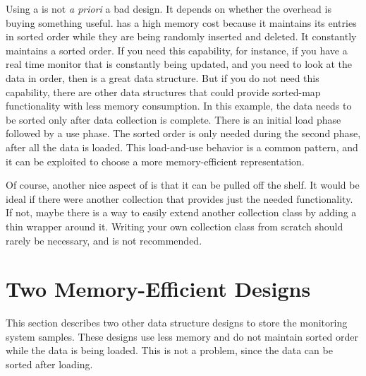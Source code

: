 

Using a  is not \textit{a priori} a bad design. It depends on
whether the overhead is buying something useful.  has a high
memory cost because it maintains its entries in sorted order while they are
being randomly inserted and deleted. It constantly maintains a sorted order. If
you need this capability, for instance, if you have a real time monitor that is
constantly being updated, and you need to look at the data in order, then
 is a great data structure.  But if you do not need
this capability, there are other data structures that could provide sorted-map
functionality with less memory consumption. In this example, the data needs to
be sorted only after data collection is complete. There is an initial load phase
followed by a use phase. The sorted order is only needed during the second
phase, after all the data is loaded. This load-and-use behavior is a common
pattern, and it can be exploited to choose a more memory-efficient
representation.

Of course, another nice aspect of  is that it can be pulled off
the shelf. It would be ideal if there were another collection that provides just
the needed functionality. If not, maybe there is a way to easily extend another
collection class by adding a thin wrapper around it. Writing your own collection
class from scratch should rarely be necessary, and is not recommended.

\section{Two Memory-Efficient Designs}
\label{sec:better-designs} 

This section describes two other data structure designs to store the monitoring
system samples. These designs use less memory and do not maintain sorted order
while the data is being loaded. This is not a problem, since the data can be
sorted after loading.

